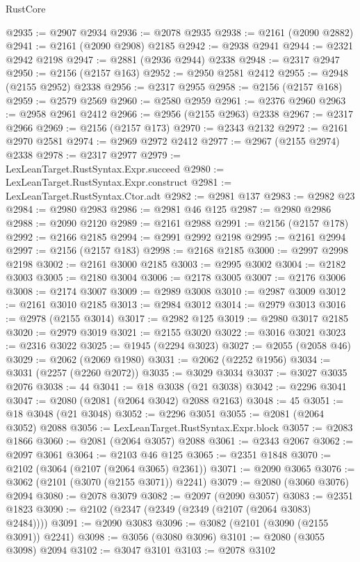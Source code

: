 \begin{lexlean}{RustCore}
\begin{coremodule}
@2935 := @2907 @2934
@2936 := @2078 @2935
@2938 := @2161 (@2090 @2882)
@2941 := @2161 (@2090 @2908) @2185
@2942 := @2938 @2941
@2944 := @2321 @2942 @2198
@2947 := @2881 (@2936 @2944) @2338
@2948 := @2317 @2947
@2950 := @2156 (@2157 @163)
@2952 := @2950 @2581 @2412
@2955 := @2948 (@2155 @2952) @2338
@2956 := @2317 @2955
@2958 := @2156 (@2157 @168)
@2959 := @2579 @2569
@2960 := @2580 @2959
@2961 := @2376 @2960
@2963 := @2958 @2961 @2412
@2966 := @2956 (@2155 @2963) @2338
@2967 := @2317 @2966
@2969 := @2156 (@2157 @173)
@2970 := @2343 @2132
@2972 := @2161 @2970 @2581
@2974 := @2969 @2972 @2412
@2977 := @2967 (@2155 @2974) @2338
@2978 := @2317 @2977
@2979 := LexLeanTarget.RustSyntax.Expr.succeed
@2980 := LexLeanTarget.RustSyntax.Expr.construct
@2981 := LexLeanTarget.RustSyntax.Ctor.adt
@2982 := @2981 @137
@2983 := @2982 @23
@2984 := @2980 @2983
@2986 := @2981 @46 @125
@2987 := @2980 @2986
@2988 := @2090 @2120
@2989 := @2161 @2988
@2991 := @2156 (@2157 @178)
@2992 := @2166 @2185
@2994 := @2991 @2992 @2198
@2995 := @2161 @2994
@2997 := @2156 (@2157 @183)
@2998 := @2168 @2185
@3000 := @2997 @2998 @2198
@3002 := @2161 @3000 @2185
@3003 := @2995 @3002
@3004 := @2182 @3003
@3005 := @2180 @3004
@3006 := @2178 @3005
@3007 := @2176 @3006
@3008 := @2174 @3007
@3009 := @2989 @3008
@3010 := @2987 @3009
@3012 := @2161 @3010 @2185
@3013 := @2984 @3012
@3014 := @2979 @3013
@3016 := @2978 (@2155 @3014)
@3017 := @2982 @125
@3019 := @2980 @3017 @2185
@3020 := @2979 @3019
@3021 := @2155 @3020
@3022 := @3016 @3021
@3023 := @2316 @3022
@3025 := @1945 (@2294 @3023)
@3027 := @2055 (@2058 @46)
@3029 := @2062 (@2069 @1980)
@3031 := @2062 (@2252 @1956)
@3034 := @3031 (@2257 (@2260 @2072))
@3035 := @3029 @3034
@3037 := @3027 @3035 @2076
@3038 := 44
@3041 := @18 @3038 (@21 @3038)
@3042 := @2296 @3041
@3047 := @2080 (@2081 (@2064 @3042) @2088 @2163)
@3048 := 45
@3051 := @18 @3048 (@21 @3048)
@3052 := @2296 @3051
@3055 := @2081 (@2064 @3052) @2088
@3056 := LexLeanTarget.RustSyntax.Expr.block
@3057 := @2083 @1866
@3060 := @2081 (@2064 @3057) @2088
@3061 := @2343 @2067
@3062 := @2097 @3061
@3064 := @2103 @46 @125
@3065 := @2351 @1848
@3070 := @2102 (@3064 (@2107 (@2064 @3065) @2361))
@3071 := @2090 @3065
@3076 := @3062 (@2101 (@3070 (@2155 @3071)) @2241)
@3079 := @2080 (@3060 @3076) @2094
@3080 := @2078 @3079
@3082 := @2097 (@2090 @3057)
@3083 := @2351 @1823
@3090 := @2102 (@2347 (@2349 (@2349 (@2107 (@2064 @3083) @2484))))
@3091 := @2090 @3083
@3096 := @3082 (@2101 (@3090 (@2155 @3091)) @2241)
@3098 := @3056 (@3080 @3096)
@3101 := @2080 (@3055 @3098) @2094
@3102 := @3047 @3101
@3103 := @2078 @3102

\end{coremodule}
\end{lexlean}
